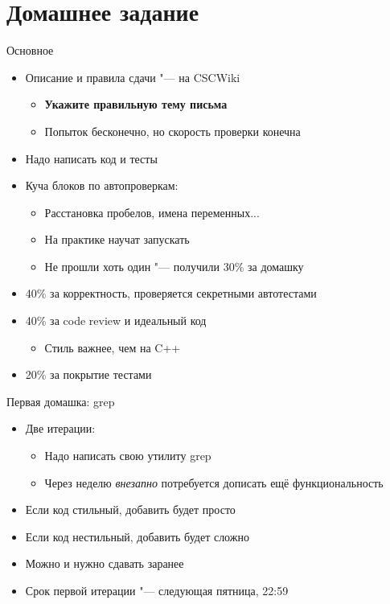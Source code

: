 \section{Домашнее задание}

\begin{frame}[t]{Основное}
	\begin{itemize}
		\item Описание и правила сдачи "--- на CSCWiki
			\begin{itemize}
				\item \textbf{Укажите правильную тему письма}
				\item Попыток бесконечно, но скорость проверки конечна
			\end{itemize}
		\item Надо написать код и тесты
		\item Куча блоков по автопроверкам:
			\begin{itemize}
			\item Расстановка пробелов, имена переменных...
			\item На практике научат запускать
			\item Не прошли хоть один "--- получили 30\% за домашку
			\end{itemize}
		\item 40\% за корректность, проверяется секретными автотестами
		\item 40\% за code review и идеальный код
			\begin{itemize}
			\item Стиль важнее, чем на C++
			\end{itemize}
		\item 20\% за покрытие тестами
	\end{itemize}
\end{frame}

\begin{frame}[t]{Первая домашка: grep}
	\begin{itemize}
		\item Две итерации:
			\begin{itemize}
			\item Надо написать свою утилиту grep
			\item Через неделю \textit{внезапно} потребуется дописать
				ещё функциональность
			\end{itemize}
		\item Если код стильный, добавить будет просто
		\item Если код нестильный, добавить будет сложно
		\item Можно и нужно сдавать заранее
		\item Срок первой итерации "--- следующая пятница, 22:59
	\end{itemize}
\end{frame}

